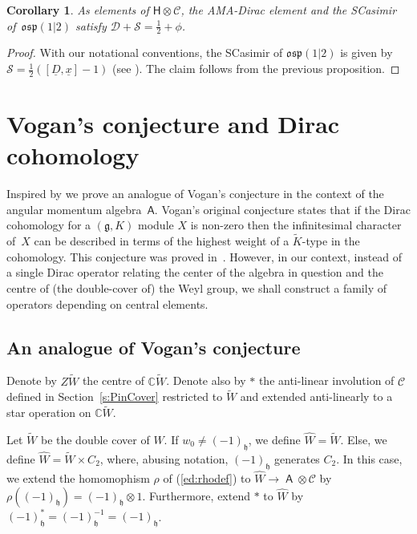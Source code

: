 \documentclass[pdftex]{sigma}
\numberwithin{equation}{section}
\newtheorem{Corollary}[Theorem]{Corollary}
\newcommand{\fh}{\mathfrak{h}}
\newcommand{\bbc}{\mathbb{C}}
\newcommand{\Cc}{\mathcal{C}}
\newcommand{\ux}{\underline{x}}
\newcommand{\uD}{\underline{D}}
\DeclareMathOperator{\ama}{\mathsf{A}}
\begin{document}
\begin{Corollary}
As elements of $\mathsf{H}\otimes\mathcal{C}$, the AMA-Dirac element and the SCasimir of~$\mathfrak{osp}(1|2)$ satisfy
$\mathcal{D} +\mathcal{S}=\frac{1}{2} + \phi$.
\end{Corollary}

\begin{proof}
With our notational conventions, the SCasimir of $\mathfrak{osp}(1|2)$ is given by
$\mathcal{S} = \tfrac{1}{2}([\uD,\ux] - 1)$ (see \cite[equation~(3.3)]{DOV18a}). The claim follows from the previous proposition.
\end{proof}

\section{Vogan's conjecture and Dirac cohomology}\label{s:Cohomology}

Inspired by \cite{BCT12} we prove an analogue of Vogan's conjecture in the context of the angular momentum algebra~$\mathsf{A}$. Vogan's original conjecture states that if the Dirac cohomology for a $(\mathfrak{g},K)$ module $X$ is non-zero then the infinitesimal character of~$X$ can be described in terms of the highest weight of a $\tilde{K}$-type in the cohomology. This conjecture was proved in~\cite{HP02}. However, in our context, instead of a single Dirac operator relating the center of the algebra in question and the centre of (the double-cover of) the Weyl group, we shall construct a family of operators depending on central elements.

\subsection{An analogue of Vogan's conjecture}
Denote by $Z\tilde W$ the centre of $\bbc \tilde W$. Denote also by $\ast$ the anti-linear involution of $\Cc$ defined in Section~\ref{s:PinCover} restricted to $\tilde W$ and extended anti-linearly to a star operation on $\bbc \tilde{W}$.

\begin{Definition}\label{d:hatW} Let $\tilde{W}$ be the double cover of $W$. If $w_0 \neq(-1)_\fh$, we define $\hat{W} = \tilde{W}$. Else, we define $\hat{W} = \tilde{W} \times C_2$, where, abusing notation, $(-1)_\fh$ generates $C_2$. In this case, we extend the homomophism $\rho$ of (\ref{ed:rhodef}) to $\hat{W} \to \ama \otimes \Cc$ by $\rho((-1)_\fh) = (-1)_\fh \otimes 1$. Furthermore, extend $*$ to $\hat{W}$ by $(-1)_\fh^*=(-1)_\fh^{-1} = (-1)_\fh$.
\end{Definition}
\end{document}
